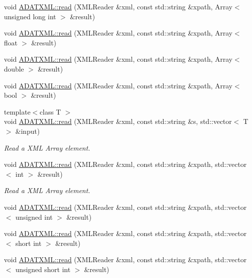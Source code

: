 \begin{DoxyCompactItemize}
\item 
void \mbox{\hyperlink{group__io_gae84bf39f198c8718403a15bc408a09a1}{A\+D\+A\+T\+X\+M\+L\+::read}} (X\+M\+L\+Reader \&xml, const std\+::string \&xpath, Array$<$ unsigned long int $>$ \&result)
\item 
void \mbox{\hyperlink{group__io_gab83c1ad39e65d00b48e6e4b0611c270f}{A\+D\+A\+T\+X\+M\+L\+::read}} (X\+M\+L\+Reader \&xml, const std\+::string \&xpath, Array$<$ float $>$ \&result)
\item 
void \mbox{\hyperlink{group__io_gade490f5b9db35aa7bc58c6bb07848048}{A\+D\+A\+T\+X\+M\+L\+::read}} (X\+M\+L\+Reader \&xml, const std\+::string \&xpath, Array$<$ double $>$ \&result)
\item 
void \mbox{\hyperlink{group__io_gaea910d2bb1864c350f979d14f6c1527f}{A\+D\+A\+T\+X\+M\+L\+::read}} (X\+M\+L\+Reader \&xml, const std\+::string \&xpath, Array$<$ bool $>$ \&result)
\item 
{\footnotesize template$<$class T $>$ }\\void \mbox{\hyperlink{group__io_gae58a41d3a914bc8eba546ada945fa97f}{A\+D\+A\+T\+X\+M\+L\+::read}} (X\+M\+L\+Reader \&xml, const std\+::string \&s, std\+::vector$<$ T $>$ \&input)
\begin{DoxyCompactList}\small\item\em Read a X\+ML Array element. \end{DoxyCompactList}\item 
void \mbox{\hyperlink{group__io_gaba3ec8cd866164ea8bdc810edeaf8210}{A\+D\+A\+T\+X\+M\+L\+::read}} (X\+M\+L\+Reader \&xml, const std\+::string \&xpath, std\+::vector$<$ int $>$ \&result)
\begin{DoxyCompactList}\small\item\em Read a X\+ML Array element. \end{DoxyCompactList}\item 
void \mbox{\hyperlink{group__io_ga745a0160808dcca1ec6805d77979bfcc}{A\+D\+A\+T\+X\+M\+L\+::read}} (X\+M\+L\+Reader \&xml, const std\+::string \&xpath, std\+::vector$<$ unsigned int $>$ \&result)
\item 
void \mbox{\hyperlink{group__io_ga5ca3f42dfcdc536156476e7f6d6db61c}{A\+D\+A\+T\+X\+M\+L\+::read}} (X\+M\+L\+Reader \&xml, const std\+::string \&xpath, std\+::vector$<$ short int $>$ \&result)
\item 
void \mbox{\hyperlink{group__io_gacd64b080900323aa538c91b95c83248d}{A\+D\+A\+T\+X\+M\+L\+::read}} (X\+M\+L\+Reader \&xml, const std\+::string \&xpath, std\+::vector$<$ unsigned short int $>$ \&result)

\end{DoxyCompactItemize}
